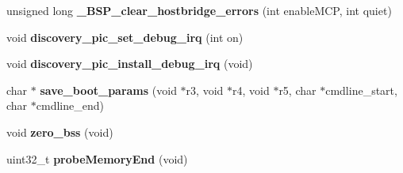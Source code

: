 \begin{DoxyCompactItemize}
unsigned long {\bfseries \+\_\+\+B\+S\+P\+\_\+clear\+\_\+hostbridge\+\_\+errors} (int enable\+M\+CP, int quiet)
\item 
\mbox{\label{group__RTEMSBSPsPowerPCBeatnik_ga3a3c49ee890bd1f1a1f29652b93710ec}} 
void {\bfseries discovery\+\_\+pic\+\_\+set\+\_\+debug\+\_\+irq} (int on)
\item 
\mbox{\label{group__RTEMSBSPsPowerPCBeatnik_ga8d3ff035330c44eab2e38759216d6611}} 
void {\bfseries discovery\+\_\+pic\+\_\+install\+\_\+debug\+\_\+irq} (void)
\item 
\mbox{\label{group__RTEMSBSPsPowerPCBeatnik_ga127266abfcf87d5e48d649092e2951e9}} 
char $\ast$ {\bfseries save\+\_\+boot\+\_\+params} (void $\ast$r3, void $\ast$r4, void $\ast$r5, char $\ast$cmdline\+\_\+start, char $\ast$cmdline\+\_\+end)
\item 
\mbox{\label{group__RTEMSBSPsPowerPCBeatnik_gaa1c249f197a325121cc9678b1665c29b}} 
void {\bfseries zero\+\_\+bss} (void)
\item 
\mbox{\label{group__RTEMSBSPsPowerPCBeatnik_ga6cf955ad0520c8a9213c829a2e80eac3}} 
uint32\+\_\+t {\bfseries probe\+Memory\+End} (void)
\end{DoxyCompactItemize}
